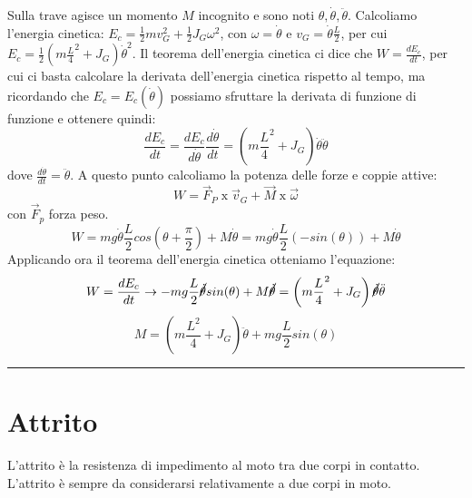 Sulla trave agisce un momento $M$ incognito e sono noti $\theta, \dot{\theta}, \ddot{\theta}$.\newline
Calcoliamo l'energia cinetica: $E_c = \frac{1}{2} m v_G^2 + \frac{1}{2} J_G \omega^2$, con $\omega = \dot{\theta}$ e $v_G = \dot{\theta} \frac{L}{2}$, per cui $E_c = \frac{1}{2} \left( m \frac{L}{4}^2 + J_G \right) \dot{\theta}^2$.\newline
Il teorema dell'energia cinetica ci dice che $W = \frac{dE_c}{dt}$, per cui ci basta calcolare la derivata dell'energia cinetica rispetto al tempo, ma ricordando che $E_c = E_c(\dot{\theta})$ possiamo sfruttare la derivata di funzione di funzione e ottenere quindi:
\[
    \frac{dE_c}{dt} = \frac{dE_c}{d \dot{\theta}} \frac{d \dot{\theta}}{ dt} = \left( m \frac{L}{4}^2 + J_G \right) \dot{\theta} \ddot{\theta}
\]
dove $\frac{d \dot{\theta}}{dt} = \ddot{\theta}$.\newline
A questo punto calcoliamo la potenza delle forze e coppie attive:
\[
    W = \vec{F}_P \; \text{x}\; \vec{v}_G + \vec{M} \; \text{x}\; \vec{\omega}
\]
con $\vec{F}_p$ forza peso.
\[
    W = mg \dot{\theta} \frac{L}{2} cos\left(\theta + \frac{\pi}{2}\right) + M \dot{\theta} = mg \dot{\theta} \frac{L}{2} (- sin(\theta))+ M \dot{\theta}
\]
Applicando ora il teorema dell'energia cinetica otteniamo l'equazione:
\[
    W = \frac{dE_c}{dt} \rightarrow -mg \frac{L}{2} \cancel{\dot{\theta}} sin(\theta) + M \cancel{\dot{\theta}} = \left( m \frac{L}{4}^2 + J_G \right) \cancel{\dot{\theta}} \ddot{\theta}
\]
\[
    M = \left(m \frac{L^2}{4} + J_G\right) \ddot{\theta} + mg \frac{L}{2} sin(\theta)
\]
\rule{\textwidth}{0,4pt}
\newpage
\section{Attrito}
L'attrito è la resistenza di impedimento al moto tra due corpi in contatto. L'attrito è sempre da considerarsi relativamente a due corpi in moto.\newline
\newline
